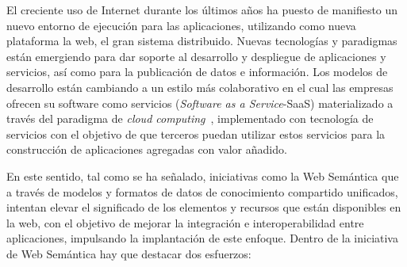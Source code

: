 El creciente uso de Internet durante los últimos años ha puesto de manifiesto un
nuevo entorno de ejecución para las aplicaciones, utilizando como nueva
plataforma la web, el gran sistema distribuido. Nuevas tecnologías y paradigmas
están emergiendo para dar soporte al desarrollo y despliegue de aplicaciones y
servicios, así como para la publicación de datos e información. Los modelos de
desarrollo están cambiando a un estilo más colaborativo en el cual las empresas
ofrecen su software como servicios (\textit{Software as a Service}-\gls{SaaS}) materializado a
través del paradigma de \textit{cloud computing}~\cite{Armbrust09abovethe}, implementado con tecnología de
servicios con el objetivo de que terceros puedan utilizar estos servicios para
la construcción de aplicaciones agregadas con valor añadido. 

En este sentido, tal como se ha señalado, iniciativas como la Web Semántica que a través de modelos y
formatos de datos de conocimiento compartido unificados, intentan elevar el
significado de los elementos y recursos que están disponibles en la web, con el
objetivo de mejorar la integración e interoperabilidad entre aplicaciones, 
impulsando la implantación de este enfoque. Dentro de la iniciativa de Web
Semántica hay que destacar dos esfuerzos: 
